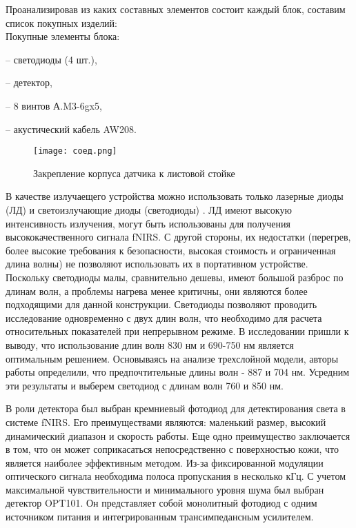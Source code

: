 Проанализировав из каких составных элементов состоит каждый блок, составим список покупных изделий:\\
Покупные элементы блока:

– светодиоды (4 шт.),

– детектор,

– 8 винтов А.M3-6gx5,

– акустический кабель AW208.

\begin{figure}[!h]
\begin{center}
\texttt{[image: соед.png]}
\caption{\centering Закрепление корпуса датчика к листовой стойке}
\label{соед}
\end{center}
\end{figure}
В качестве излучаещего устройства можно использовать только лазерные диоды (ЛД) и светоизлучающие диоды (светодиоды) \cite{litlink15}. ЛД имеют высокую интенсивность излучения, могут быть использованы для получения высококачественного сигнала fNIRS. С другой стороны, их недостатки (перегрев, более высокие требования к безопасности, высокая стоимость и ограниченная длина волны) не позволяют использовать их в портативном устройстве. Поскольку светодиоды малы, сравнительно дешевы, имеют большой разброс по длинам волн, а проблемы нагрева менее критичны, они являются более подходящими для данной конструкции. Светодиоды позволяют проводить исследование одновременно с двух длин волн, что необходимо для расчета относительных показателей при непрерывном режиме. В исследовании \cite{litlink23} пришли к выводу, что использование длин волн 830 нм и 690-750 нм является оптимальным решением. Основываясь на анализе трехслойной модели, авторы работы \cite{litlink24} определили, что предпочтительные длины волн - 887 и 704 нм. Усредним эти результаты и выберем светодиод с длинам волн 760 и 850 нм. 

В роли детектора был выбран кремниевый фотодиод для детектирования света в системе fNIRS. Его преимуществами являются: маленький размер, высокий динамический диапазон и скорость работы. Еще одно преимущество заключается в том, что он может соприкасаться непосредственно с поверхностью кожи, что является наиболее эффективным методом. Из-за фиксированной модуляции оптического сигнала необходима полоса пропускания в несколько кГц. С учетом максимальной чувствительности и минимального уровня шума был выбран детектор OPT101. Он представляет собой монолитный фотодиод с одним источником питания и интегрированным трансимпедансным усилителем.

